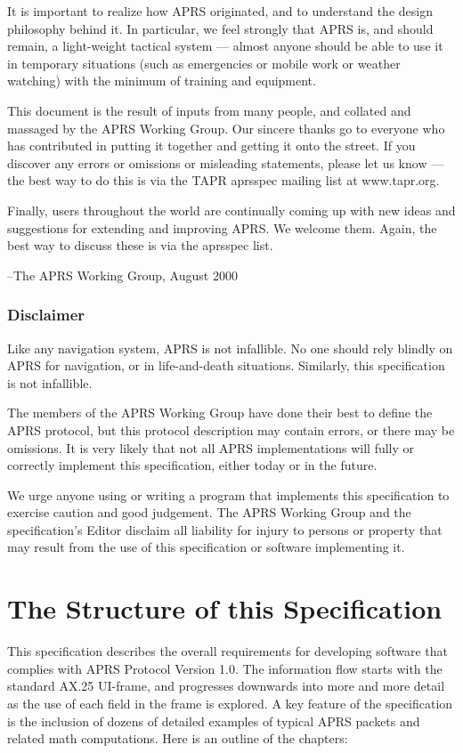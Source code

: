 \documentclass{scrreprt}[letter]
\begin{document}
It is important to realize how APRS originated, and to understand the
design philosophy behind it. In particular, we feel strongly that APRS
is, and should remain, a light-weight tactical system — almost anyone
should be able to use it in temporary situations (such as emergencies
or mobile work or weather watching) with the minimum of training and
equipment.

This document is the result of inputs from many people, and collated
and massaged by the APRS Working Group. Our sincere thanks go to
everyone who has contributed in putting it together and getting it
onto the street. If you discover any errors or omissions or misleading
statements, please let us know — the best way to do this is via the
TAPR aprsspec mailing list at www.tapr.org.

Finally, users throughout the world are continually coming up with new
ideas and suggestions for extending and improving APRS. We welcome
them.  Again, the best way to discuss these is via the aprsspec list.

--The APRS Working Group, August 2000


\section*{Disclaimer}

Like any navigation system, APRS is not infallible. No one should rely
blindly on APRS for navigation, or in life-and-death situations. Similarly,
this specification is not infallible.

The members of the APRS Working Group have done their best to define the
APRS protocol, but this protocol description may contain errors, or there
may be omissions. It is very likely that not all APRS implementations will
fully or correctly implement this specification, either today or in the future.


We urge anyone using or writing a program that implements this
specification to exercise caution and good judgement. The APRS Working
Group and the specification’s Editor disclaim all liability for injury to
persons or property that may result from the use of this specification or
software implementing it.


\part{The Structure of this Specification}

This specification describes the overall requirements for developing software
that complies with APRS Protocol Version 1.0. The information flow starts
with the standard AX.25 UI-frame, and progresses downwards into more and
more detail as the use of each field in the frame is explored.
A key feature of the specification is the inclusion of dozens of detailed
examples of typical APRS packets and related math computations.
Here is an outline of the chapters:
\end{document}
